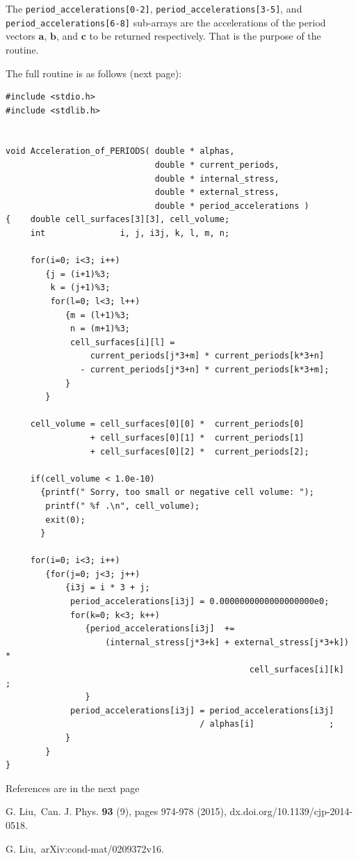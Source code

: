 \documentclass[aps]{revtex4}
\newcommand{\ba}{\mathbf a}
\newcommand{\bb}{\mathbf b}
\newcommand{\bc}{\mathbf c}
\begin{document}
The  \verb!period_accelerations[0-2]!,   \verb!period_accelerations[3-5]!, and  \verb!period_accelerations[6-8]! sub-arrays 
are the accelerations of the period vectors $\ba$, $\bb$, and $\bc$ to be returned respectively. That is the purpose of the routine.



  \vspace{0cm}
The full routine is as follows (next page):

\newpage

\begin{verbatim}
#include <stdio.h>
#include <stdlib.h>


void Acceleration_of_PERIODS( double * alphas,
                              double * current_periods,
                              double * internal_stress,
                              double * external_stress,
                              double * period_accelerations )
{    double cell_surfaces[3][3], cell_volume;
     int               i, j, i3j, k, l, m, n;

     for(i=0; i<3; i++)
        {j = (i+1)%3;
         k = (j+1)%3;
         for(l=0; l<3; l++)
            {m = (l+1)%3;
             n = (m+1)%3;
             cell_surfaces[i][l] =
                 current_periods[j*3+m] * current_periods[k*3+n]
               - current_periods[j*3+n] * current_periods[k*3+m];
            }
        }

     cell_volume = cell_surfaces[0][0] *  current_periods[0]
                 + cell_surfaces[0][1] *  current_periods[1]
                 + cell_surfaces[0][2] *  current_periods[2];

     if(cell_volume < 1.0e-10)
       {printf(" Sorry, too small or negative cell volume: ");
        printf(" %f .\n", cell_volume);
        exit(0);
       }

     for(i=0; i<3; i++)
        {for(j=0; j<3; j++)
            {i3j = i * 3 + j;
             period_accelerations[i3j] = 0.0000000000000000000e0;
             for(k=0; k<3; k++)
                {period_accelerations[i3j]  +=
                    (internal_stress[j*3+k] + external_stress[j*3+k]) *
                                                 cell_surfaces[i][k]  ;
                }
             period_accelerations[i3j] = period_accelerations[i3j]
                                       / alphas[i]               ;
            }
        }
}

\end{verbatim}

\vspace{3cm}

\hspace{3cm}\LARGE{References} are in the next page

\newpage

\begin{references}

  G. Liu,~Can. J. Phys. \textbf {93} (9), pages 974-978 (2015), dx.doi.org/10.1139/cjp-2014-0518.

 G. Liu,~arXiv:cond-mat/0209372v16.

\end{references}
\end{document}
